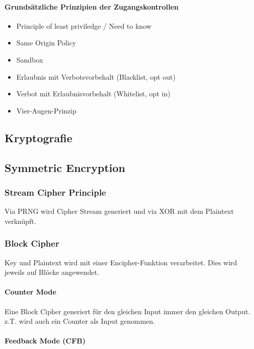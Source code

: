 \paragraph{Grundsätzliche Prinzipien der Zugangskontrollen}

\begin{itemize}
	\item Principle of least priviledge / Need to know
	\item Same Origin Policy
	\item Sandbox
	\item Erlaubnis mit Verbotsvorbehalt (Blacklist, opt out)
	\item Verbot mit Erlaubnisvorbehalt (Whitelist, opt in)
	\item Vier-Augen-Prinzip
\end{itemize}


\subsection{Kryptografie}



\subsection{Symmetric Encryption}

\subsubsection{Stream Cipher Principle}
Via PRNG wird Cipher Stream generiert und via XOR mit dem Plaintext verknüpft.

\subsubsection{Block Cipher}
Key und Plaintext wird mit einer Encipher-Funktion verarbeitet. Dies wird jeweils auf Blöcke angewendet.

\paragraph{Counter Mode}
Eine Block Cipher generiert für den gleichen Input immer den gleichen Output.
z.T. wird auch ein Counter als Input genommen.

\paragraph{Feedback Mode (CFB)}

